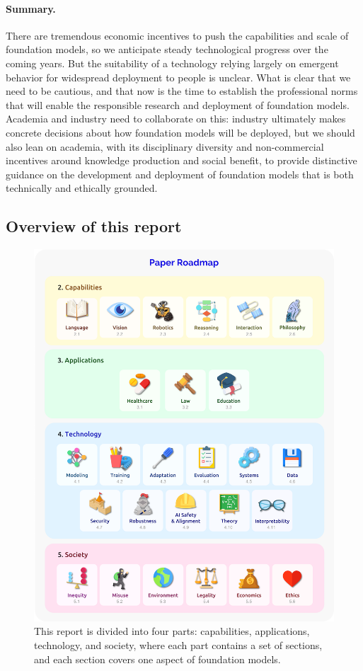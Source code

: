 \paragraph{Summary.}
There are tremendous economic incentives to push the capabilities and scale of foundation models,
so we anticipate steady technological progress over the coming years.
But the suitability of a technology relying largely on emergent behavior
for widespread deployment to people is unclear.
What is clear that we need to be cautious,
and that now is the time to establish the professional norms that will enable the responsible research and deployment
of foundation models.
Academia and industry need to collaborate on this:
industry ultimately makes concrete decisions about how foundation models will be deployed,
but we should also lean on academia,
with its disciplinary diversity and non-commercial incentives around knowledge production and social benefit,
to provide distinctive guidance on the development and deployment of foundation models
that is both technically and ethically grounded.

\subsection{Overview of this report}
\label{sec:overview}

\begin{figure}[t]
\centering
\includegraphics[width=\linewidth]{figures/Roadmap.png}
\caption{This report is divided into four parts: capabilities, applications, technology, and society,
where each part contains a set of sections,
and each section covers one aspect of foundation models.
\label{fig:roadmap}
}
\end{figure}

